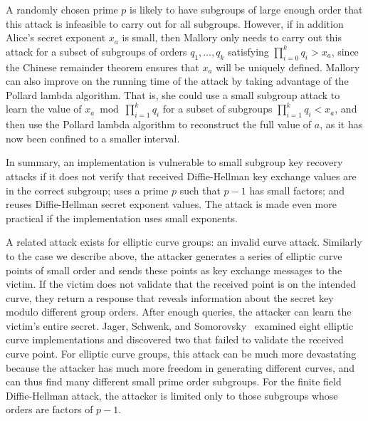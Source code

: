 A randomly chosen prime $p$ is likely to have subgroups of large enough order
that this attack is infeasible to carry out for all subgroups.  However, if in
addition Alice's secret exponent $x_a$ is small, then Mallory only needs to carry out this
attack for a subset of subgroups of orders $q_1, \dots, q_k$ satisfying
$\prod_{i=0}^k q_i > x_a$, since the Chinese remainder theorem ensures that $x_a$
will be uniquely defined.
Mallory can also improve on the running time of the attack by taking advantage
of the Pollard lambda algorithm.  That is, she could use a small subgroup
attack to learn the value of $x_a \bmod \prod_{i=1}^k q_i$ for a subset of
subgroups $\prod_{i=1}^k q_i < x_a$, and then use the Pollard lambda algorithm to
reconstruct the full value of $a$, as it has now been confined to a smaller
interval.

In summary, an implementation is vulnerable to small subgroup key recovery
attacks if it does not verify that received Diffie-Hellman key exchange values
are in the correct subgroup; uses a prime $p$ such that $p-1$ has small
factors; and reuses Diffie-Hellman secret exponent values.  The attack is made
even more practical if the implementation uses small exponents.

A related attack exists for elliptic curve groups: an invalid curve attack.
Similarly to the case we describe above, the attacker generates a series of
elliptic curve points of small order and sends these
points as key exchange messages to the victim.  If the victim does not validate that the received
point is on the intended curve, they return a response that reveals information
about the secret key modulo different group orders.  After enough queries, the
attacker can learn the victim's entire secret.  Jager, Schwenk, and
Somorovsky~\cite{Jager2015} examined eight elliptic curve implementations and
discovered two that failed to validate the received curve point. For elliptic
curve groups, this attack can be much more devastating because the attacker has
much more freedom in generating different curves, and can thus find many
different small prime order subgroups.  For the finite field Diffie-Hellman
attack, the attacker is limited only to those subgroups whose orders are factors
of $p-1$.

